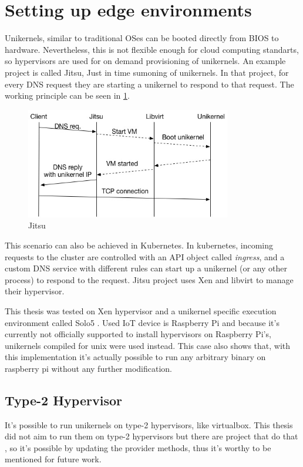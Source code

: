 
\section{Setting up edge environments}
Unikernels, similar to traditional OSes can be booted directly from BIOS to hardware. Nevertheless, this is not flexible enough for cloud computing standarts, so hypervisors are used for on demand provisioning of unikernels. An example project is called Jitsu\cite{jitsu}, Just in time sumoning of unikernels. In that project, for every DNS request they are starting a unikernel to respond to that request. The working principle can be seen in \ref{fig:jitsu}.

\begin{figure}[htpb]
    \centering
    \includegraphics[width=0.8\textwidth]{figures/jitsu.jpg}
    \caption{Jitsu \cite{jitsu}} \label{fig:jitsu}
  \end{figure}

This scenario can also be achieved in Kubernetes. In kubernetes, incoming requests to the cluster are controlled with an API object called \textit{ingress}, and a custom DNS service with different rules can start up a unikernel (or any other process) to respond to the request. Jitsu project uses Xen and libvirt to manage their hypervisor.

This thesis was tested on Xen hypervisor and a unikernel specific execution environment called Solo5 \cite{solo5}. Used IoT device is Raspberry Pi and because it's currently not officially supported to install hypervisors on Raspberry Pi's, unikernels compiled for unix were used instead. This case also shows that, with this implementation it's actually possible to run any arbitrary binary on raspberry pi without any further modification.

\subsection{Type-2 Hypervisor}
It's possible to run unikernels on type-2 hypervisors, like virtualbox. This thesis did not aim to run them on type-2 hypervisors but there are project that do that , so it's possible by updating the provider methods, thus it's worthy to be mentioned for future work.

